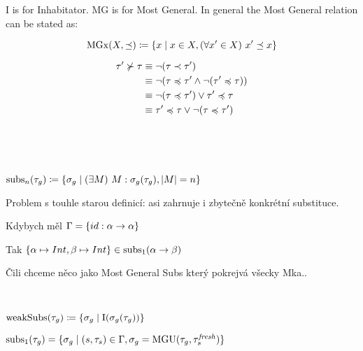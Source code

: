 \documentclass[a4paper,oneside]{memoir}
\begin{document}
I is for Inhabitator. MG is for Most General. In general the Most General relation can be stated as:

$$\operatorname{MGx}(X,\preceq) \coloneqq \{ x \mid x \in X, (\forall x^\prime \in X)\ x^\prime \preceq x \}$$



\begin{align*}
\tau^\prime \nsucc \tau &\equiv \neg (\tau \prec \tau^\prime)   \\
  &\equiv \neg ( \tau \preccurlyeq \tau^\prime \wedge \neg (\tau^\prime \preccurlyeq \tau) )   \\
  &\equiv \neg ( \tau \preccurlyeq \tau^\prime) \vee \tau^\prime \preccurlyeq \tau   \\  
  &\equiv \tau^\prime \preccurlyeq \tau \vee  \neg ( \tau \preccurlyeq \tau^\prime)    
\end{align*}

~

~

\newcommand{\subs}[2]{\op{subs}_{#2}(#1)}

\begin{preDefinition}
$ \subs{\tau_g}{n} \defi \{ \sigma_g \mid \E{M}{M : \sigma_g(\tau_g)}, \abs{M} = n \}$
\end{preDefinition}

Problem s touhle starou definicí: asi zahrnuje i zbytečně konkrétní substituce.

Kdybych měl $\Gamma = \{id : \alpha \rightarrow \alpha \}$

Tak $\{\alpha \mapsto Int, \beta \mapsto  Int\} \in \subs{\alpha \ar \beta}{1}$

Čili chceme něco jako Most General Subs který pokrejvá všecky Mka.. 



~










$ \operatorname{weakSubs}(\tau_g) \coloneqq \{ \sigma_g \mid \operatorname{I}(\sigma_g(\tau_g)) \}$


\begin{preLemma} 
$ \subs{\tau_g}{1} = \{ \sigma_g \mid (s,\tau_s) \in \Gamma, \sigma_g = \MGU{\tau_g}{\tau^\mathit{fresh}_s}  \} $
\end{preLemma} 




\backmatter
\end{document}
